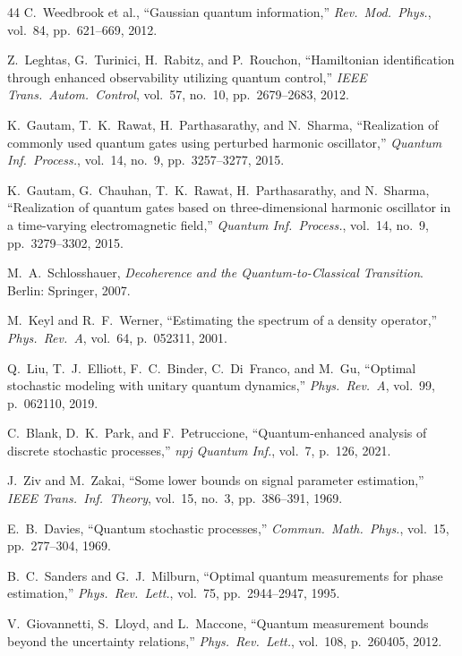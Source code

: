 \documentclass[journal,twocolumn]{IEEEtran}
\theoremstyle{definition}
\theoremstyle{plain}
\begin{document}
\begin{thebibliography}{44}
C.~Weedbrook et al., ``Gaussian quantum information,''
\emph{Rev.\ Mod.\ Phys.}, vol.~84, pp.~621--669, 2012.

Z.~Leghtas, G.~Turinici, H.~Rabitz, and P.~Rouchon,
``Hamiltonian identification through enhanced observability utilizing
quantum control,'' \emph{IEEE Trans.\ Autom.\ Control},
vol.~57, no.~10, pp.~2679--2683, 2012.

K.~Gautam, T.~K.~Rawat, H.~Parthasarathy, and N.~Sharma,
``Realization of commonly used quantum gates using perturbed harmonic
oscillator,'' \emph{Quantum Inf.\ Process.}, vol.~14, no.~9,
pp.~3257--3277, 2015.

K.~Gautam, G.~Chauhan, T.~K.~Rawat, H.~Parthasarathy, and
N.~Sharma, ``Realization of quantum gates based on three-dimensional
harmonic oscillator in a time-varying electromagnetic field,''
\emph{Quantum Inf.\ Process.}, vol.~14, no.~9, pp.~3279--3302, 2015.

M.~A.~Schlosshauer, \emph{Decoherence and the Quantum-to-Classical
Transition}. Berlin: Springer, 2007.

M.~Keyl and R.~F.~Werner, ``Estimating the spectrum of a density
operator,'' \emph{Phys.\ Rev.\ A}, vol.~64, p.~052311, 2001.

Q.~Liu, T.~J.~Elliott, F.~C.~Binder, C.~Di~Franco, and M.~Gu,
``Optimal stochastic modeling with unitary quantum dynamics,''
\emph{Phys.\ Rev.\ A}, vol.~99, p.~062110, 2019.

C.~Blank, D.~K.~Park, and F.~Petruccione,
``Quantum-enhanced analysis of discrete stochastic processes,''
\emph{npj Quantum Inf.}, vol.~7, p.~126, 2021.

J.~Ziv and M.~Zakai, ``Some lower bounds on signal parameter
estimation,'' \emph{IEEE Trans.\ Inf.\ Theory}, vol.~15, no.~3,
pp.~386--391, 1969.

E.~B.~Davies, ``Quantum stochastic processes,''
\emph{Commun.\ Math.\ Phys.}, vol.~15, pp.~277--304, 1969.

B.~C.~Sanders and G.~J.~Milburn, ``Optimal quantum measurements for
phase estimation,'' \emph{Phys.\ Rev.\ Lett.}, vol.~75,
pp.~2944--2947, 1995.

V.~Giovannetti, S.~Lloyd, and L.~Maccone,
``Quantum measurement bounds beyond the uncertainty relations,''
\emph{Phys.\ Rev.\ Lett.}, vol.~108, p.~260405, 2012.


\end{thebibliography}
\end{document}
